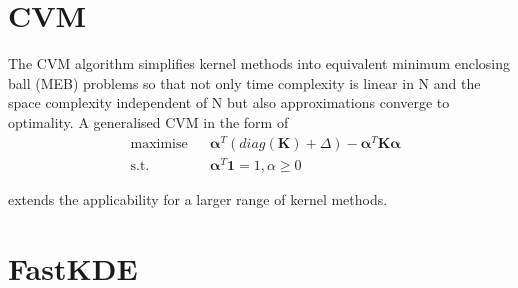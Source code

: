 \documentclass[a4paper,12pt]{report}
\begin{document}
\section{CVM}
The CVM algorithm\citep{tsa05} simplifies kernel methods into equivalent minimum enclosing ball (MEB) problems so that not only time complexity is linear in N and the space complexity independent of N but also approximations converge to optimality. A generalised CVM \citep{tsa06} in the form of 
\begin{equation}
\begin{aligned}
&\text{maximise}
&& \pmb{\alpha}^T(diag(\pmb{K})+\Delta)-\pmb{\alpha}^T\pmb{K\alpha}\\
&\text{s.t.}
&& \pmb{\alpha}^T\pmb{1}=1, \alpha \geq 0
\end{aligned}
\end{equation}

extends the applicability for a larger range of kernel methods.

 

\section{FastKDE}
\end{document}
